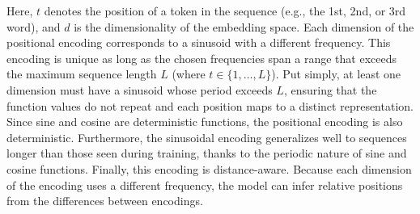 Here, $t$ denotes the position of a token in the sequence (e.g., the 1st, 2nd, or 3rd word), and $d$ is the dimensionality of 
the embedding space. Each dimension of the positional encoding corresponds to a sinusoid with a different frequency.\newline
This encoding is unique as long as the chosen frequencies span a range that exceeds the maximum sequence length $L$ 
(where $t \in \{1, \dots, L\}$). Put simply, at least one dimension must have a sinusoid whose period exceeds $L$, ensuring that 
the function values do not repeat and each position maps to a distinct representation.  Since sine and cosine are 
deterministic functions, the positional encoding is also deterministic. Furthermore, the sinusoidal encoding generalizes well to 
sequences longer than those seen during training, thanks to the periodic nature of sine and cosine functions. Finally, this 
encoding is distance-aware. Because each dimension of the encoding uses a different frequency, the model can infer relative 
positions from the differences between encodings.

